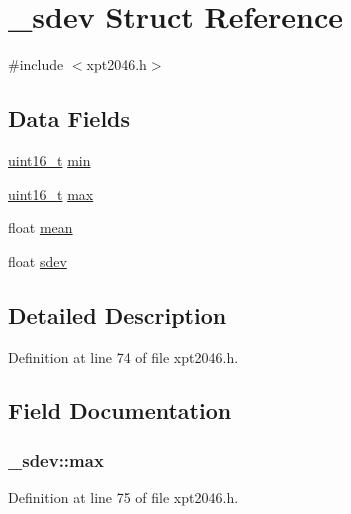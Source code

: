 \hypertarget{struct__sdev}{}\section{\+\_\+sdev Struct Reference}
\label{struct__sdev}


{\ttfamily \#include $<$xpt2046.\+h$>$}

\subsection*{Data Fields}
\begin{DoxyCompactItemize}
\item 
\hyperlink{send_8c_a273cf69d639a59973b6019625df33e30}{uint16\+\_\+t} \hyperlink{struct__sdev_af6ec6d9f07c677d6a25c12c128a60d21}{min}
\item 
\hyperlink{send_8c_a273cf69d639a59973b6019625df33e30}{uint16\+\_\+t} \hyperlink{struct__sdev_acee505856b840e75edf6af7da7bdaad3}{max}
\item 
float \hyperlink{struct__sdev_a2bd0cf80fd334fabaac9100a2538bcb5}{mean}
\item 
float \hyperlink{struct__sdev_a053a14f9e4bd729ce23aafdb1e69e48a}{sdev}
\end{DoxyCompactItemize}


\subsection{Detailed Description}


Definition at line 74 of file xpt2046.\+h.



\subsection{Field Documentation}
\subsubsection[{\texorpdfstring{max}{max}}]{ \+\_\+sdev\+::max}\hypertarget{struct__sdev_acee505856b840e75edf6af7da7bdaad3}{}\label{struct__sdev_acee505856b840e75edf6af7da7bdaad3}


Definition at line 75 of file xpt2046.\+h.

